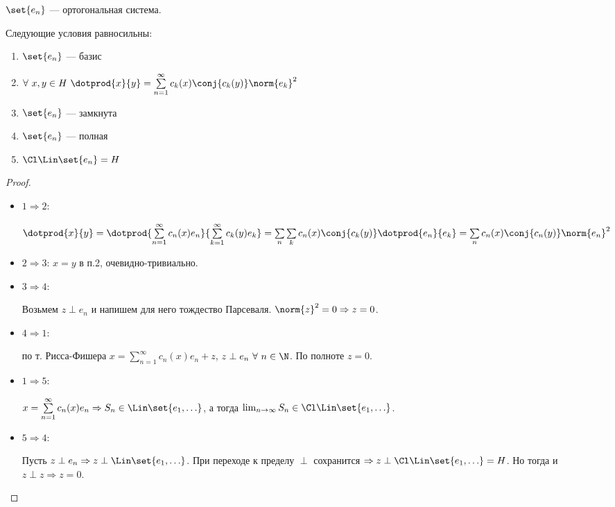 \begin{theorem}
    $\set{e_n}$ --- ортогональная система.

    Следующие условия равносильны:
    \begin{enumerate}
        \item $\set{e_n}$ --- базис
        \item $\forall\ x, y \in H\ \dotprod{x}{y} = \sum\limits_{n=1}^\infty c_k(x)\conj{c_k(y)} \norm{e_k}^2$
        \item $\set{e_n}$ --- замкнута
        \item $\set{e_n}$ ---  полная
        \item $\Cl \Lin \set{e_n} = H$
    \end{enumerate}
\end{theorem}
\begin{proof} $ $
    \begin{itemize}
        \item $1 \Rightarrow 2$:

              $\dotprod{x}{y} = \dotprod{\sum\limits_{n=1}^\infty c_n(x)e_n}{\sum\limits_{k=1}^\infty c_k(y) e_k}
                  = \sum\limits_n \sum\limits_k c_n(x) \conj{c_k(y)} \dotprod{e_n}{e_k} = \sum\limits_n c_n(x) \conj{c_n(y)} \norm{e_n}^2$

        \item $2 \Rightarrow 3$: $x = y$ в п.2, очевидно-тривиально.
        \item $3 \Rightarrow 4$:

              Возьмем $z \perp e_n$ и напишем для него тождество Парсеваля. $\norm{z}^2 = 0 \Rightarrow z = 0$.

        \item $4 \Rightarrow 1$:

              по т. Рисса-Фишера $x = \sum\limits_{n=1}^\infty c_n(x) e_n + z$, $z \perp e_n \ \forall\ n \in \N$.
              По полноте $z = 0$.

        \item $1 \Rightarrow 5$:

              $x = \sum\limits_{n=1}^\infty c_n(x) e_n \Rightarrow S_n \in \Lin \set{e_1, \ldots}$, а тогда
              $\lim_{n \to \infty} S_n \in \Cl \Lin \set{e_1, \ldots}$.

        \item $5 \Rightarrow 4$:

              Пусть $z \perp e_n \Rightarrow z \perp \Lin \set{e_1, \ldots}$.
              При переходе к пределу $\perp$ сохранится $\Rightarrow z \perp \Cl \Lin \set{e_1, \ldots} = H$.
              Но тогда и $z \perp z \Rightarrow z = 0$.
    \end{itemize}
\end{proof}

